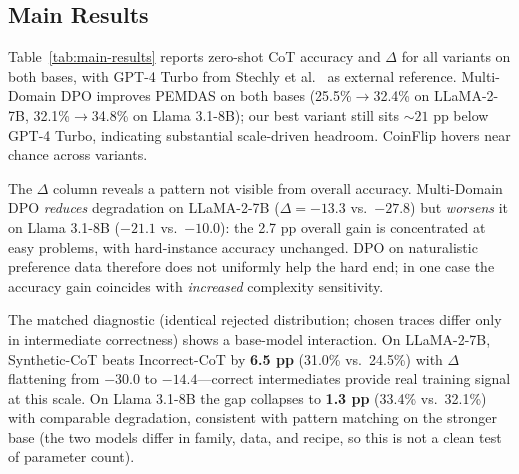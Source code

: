 \documentclass{article}
\begin{document}
\subsection{Main Results}
\label{sec:main-results}

Table~\ref{tab:main-results} reports zero-shot CoT accuracy and $\Delta$ for all variants on both bases, with GPT-4 Turbo from Stechly et al.~\cite{stechly2024thoughtlessness} as external reference. Multi-Domain DPO improves PEMDAS on both bases (25.5\%$\to$32.4\% on LLaMA-2-7B, 32.1\%$\to$34.8\% on Llama 3.1-8B); our best variant still sits ${\sim}21$ pp below GPT-4 Turbo, indicating substantial scale-driven headroom. CoinFlip hovers near chance across variants.

The $\Delta$ column reveals a pattern not visible from overall accuracy. Multi-Domain DPO \emph{reduces} degradation on LLaMA-2-7B ($\Delta=-13.3$ vs.\ $-27.8$) but \emph{worsens} it on Llama 3.1-8B ($-21.1$ vs.\ $-10.0$): the 2.7 pp overall gain is concentrated at easy problems, with hard-instance accuracy unchanged. DPO on naturalistic preference data therefore does not uniformly help the hard end; in one case the accuracy gain coincides with \emph{increased} complexity sensitivity.

The matched diagnostic (identical rejected distribution; chosen traces differ only in intermediate correctness) shows a base-model interaction. On LLaMA-2-7B, Synthetic-CoT beats Incorrect-CoT by \textbf{6.5 pp} (31.0\% vs.\ 24.5\%) with $\Delta$ flattening from $-30.0$ to $-14.4$---correct intermediates provide real training signal at this scale. On Llama 3.1-8B the gap collapses to \textbf{1.3 pp} (33.4\% vs.\ 32.1\%) with comparable degradation, consistent with pattern matching on the stronger base (the two models differ in family, data, and recipe, so this is not a clean test of parameter count).
\end{document}
